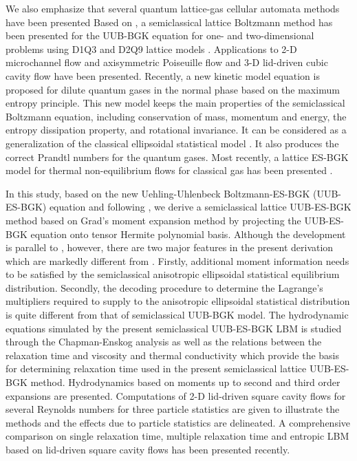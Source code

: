 \documentclass[doublecol]{epl2}
\begin{document}
We also emphasize that several quantum lattice-gas cellular automata methods have been presented \cite{Meyer1996, Boghosian98, Yepez2001, Palpacelli}
Based on \cite{Shan2006}, a semiclassical lattice Boltzmann method has been presented for the UUB-BGK equation for one- and two-dimensional problems using D1Q3 and D2Q9 lattice models \cite{Yang2009}.  Applications to 2-D microchannel flow and axisymmetric Poiseuille flow and 3-D lid-driven cubic cavity flow have been presented.  Recently, a new kinetic model equation is proposed \cite{Wu2012} for dilute quantum gases in the normal phase based on the maximum entropy principle. This new model keeps the main properties of the semiclassical Boltzmann equation, including conservation of mass, momentum and energy, the entropy dissipation property, and rotational invariance. It can be considered as a generalization of the classical ellipsoidal statistical model \cite{Holway1966}. It also produces the correct Prandtl numbers for the quantum gases.  Most recently, a lattice ES-BGK model for thermal non-equilibrium flows for classical gas has been presented \cite{Zhang2013}.

In this study, based on the new Uehling-Uhlenbeck Boltzmann-ES-BGK (UUB-ES-BGK) equation \cite{Wu2012} and following \cite{Yang2009}, we
derive a semiclassical lattice UUB-ES-BGK method based on Grad's moment expansion method by projecting the UUB-ES-BGK equation onto tensor Hermite polynomial basis.  Although the development is parallel to \cite{Yang2009}, however, there are two major features in the present derivation which are markedly different from \cite{Yang2009}. Firstly, additional moment information needs to be satisfied by the semiclassical anisotropic ellipsoidal statistical equilibrium distribution. Secondly, the decoding procedure to determine the Lagrange's multipliers required to supply to the anisotropic ellipsoidal statistical distribution is quite different from that of semiclassical UUB-BGK model.  The hydrodynamic equations simulated by the present semiclassical UUB-ES-BGK LBM is studied through the Chapman-Enskog analysis as well as the relations between the relaxation time and viscosity and thermal conductivity which provide the basis for determining relaxation time used in the present semiclassical lattice UUB-ES-BGK method.  Hydrodynamics based on moments up to second and third order expansions are presented. Computations of 2-D lid-driven square cavity flows for several Reynolds numbers for three particle statistics are given to illustrate the methods and the effects due to particle statistics are delineated.  A comprehensive comparison on single relaxation time, multiple relaxation time and entropic LBM based on lid-driven square cavity flows has been presented recently. %
\end{document}
